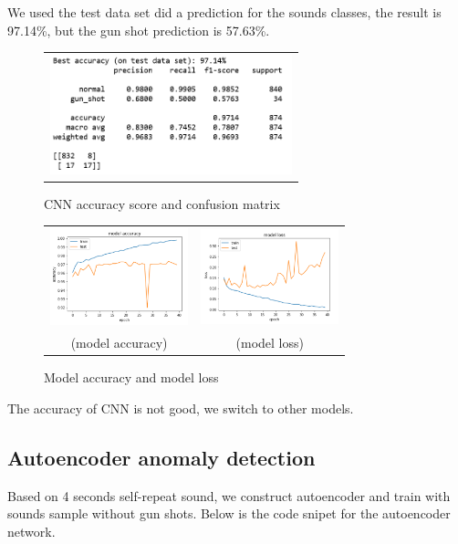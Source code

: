 \documentclass{article}
\begin{document}
We used the test data set did a prediction for the sounds classes, the result is 97.14\%, but the gun shot prediction is 57.63\%.
\begin{figure}[!htb]
	\begin{tabular}{c}
		\includegraphics[width=7cm]{pic/CNN_Pm_V2.PNG}\\
	\end{tabular}
	\caption{CNN accuracy score and confusion matrix\label{figure9}}
\end{figure}

\begin{figure}[!htb]
	\begin{tabular}{cc}
		\includegraphics[width=4cm]{pic/CNN_ACC_V2.PNG}
		&\includegraphics[width=4cm]{pic/CNN_Loss_V2.PNG}\\
		(model accuracy)&(model loss)
	\end{tabular}
	\caption{Model accuracy and model loss\label{figure10}}
\end{figure}
The accuracy of CNN is not good, we switch to other models.

\newpage
\subsection{Autoencoder anomaly detection}
Based on 4 seconds self-repeat sound, we construct autoencoder and train with sounds sample without gun shots. Below is the code snipet for the autoencoder network.
\end{document}
